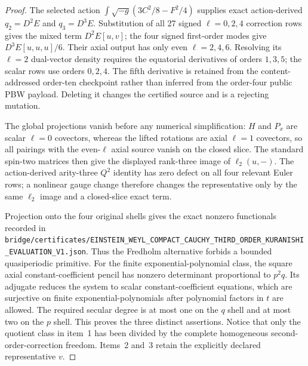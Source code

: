 \documentclass[11pt]{article}
\theoremstyle{definition}
\theoremstyle{remark}
\newcommand{\cert}[1]{\nolinkurl{#1}}
\begin{document}
\begin{proof}
The selected action
$\int\sqrt{-g}(3C^2/8-F^2/4)$ supplies exact action-derived $q_2=D^2E$ and
$q_3=D^3E$.  Substitution of all 27 signed $\ell=0,2,4$ correction rows gives
the mixed term $D^2E[u,v]$; the four signed first-order modes give
$D^3E[u,u,u]/6$.  Their axial output has only even
$\ell=2,4,6$.  Resolving its $\ell=2$ dual-vector density requires the
equatorial derivatives of orders $1,3,5$; the scalar rows use orders
$0,2,4$.  The fifth derivative is retained from the content-addressed
order-ten checkpoint rather than inferred from the order-four public PBW
payload.  Deleting it changes the certified source and is a rejecting
mutation.

The global projections vanish before any numerical simplification: $H$ and
$P_x$ are scalar $\ell=0$ covectors, whereas the lifted rotations are axial
$\ell=1$ covectors, so all pairings with the even-$\ell$ axial source vanish
on the closed slice.  The standard spin-two matrices then give the displayed
rank-three image of $\ell_2(u,-)$.  The action-derived arity-three $Q^2$
identity has zero defect on all four relevant Euler rows; a nonlinear gauge
change therefore changes the representative only by the same $\ell_2$ image
and a closed-slice exact term.

Projection onto the four original shells gives the exact nonzero functionals
recorded in
\cert{bridge/certificates/EINSTEIN_WEYL_COMPACT_CAUCHY_THIRD_ORDER_KURANISHI_EVALUATION_V1.json}.
Thus the Fredholm alternative forbids a bounded quasiperiodic primitive.
For the finite exponential-polynomial class, the square axial
constant-coefficient pencil
has nonzero determinant proportional to $p^2q$.  Its adjugate reduces the
system to scalar constant-coefficient equations, which are surjective on
finite exponential-polynomials after polynomial factors in $t$ are allowed.
The required secular degree is at most one on the $q$ shell and at most two
on the $p$ shell.  This proves the three distinct assertions.  Notice that
only the quotient class in item~1 has been divided by the complete
homogeneous second-order-correction freedom.  Items~2 and~3 retain the
explicitly declared representative $v$.
\end{proof}
\end{document}
